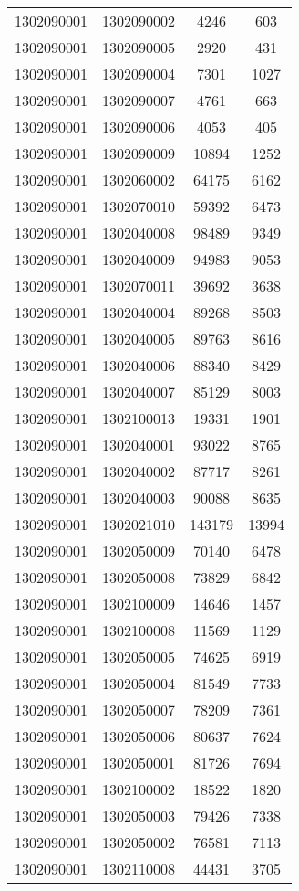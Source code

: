 \begin{longtable}{llcc}
1302090001 & 1302090002 & 4246 & 603\\
1302090001 & 1302090005 & 2920 & 431\\
1302090001 & 1302090004 & 7301 & 1027\\
1302090001 & 1302090007 & 4761 & 663\\
1302090001 & 1302090006 & 4053 & 405\\
1302090001 & 1302090009 & 10894 & 1252\\
1302090001 & 1302060002 & 64175 & 6162\\
1302090001 & 1302070010 & 59392 & 6473\\
1302090001 & 1302040008 & 98489 & 9349\\
1302090001 & 1302040009 & 94983 & 9053\\
1302090001 & 1302070011 & 39692 & 3638\\
1302090001 & 1302040004 & 89268 & 8503\\
1302090001 & 1302040005 & 89763 & 8616\\
1302090001 & 1302040006 & 88340 & 8429\\
1302090001 & 1302040007 & 85129 & 8003\\
1302090001 & 1302100013 & 19331 & 1901\\
1302090001 & 1302040001 & 93022 & 8765\\
1302090001 & 1302040002 & 87717 & 8261\\
1302090001 & 1302040003 & 90088 & 8635\\
1302090001 & 1302021010 & 143179 & 13994\\
1302090001 & 1302050009 & 70140 & 6478\\
1302090001 & 1302050008 & 73829 & 6842\\
1302090001 & 1302100009 & 14646 & 1457\\
1302090001 & 1302100008 & 11569 & 1129\\
1302090001 & 1302050005 & 74625 & 6919\\
1302090001 & 1302050004 & 81549 & 7733\\
1302090001 & 1302050007 & 78209 & 7361\\
1302090001 & 1302050006 & 80637 & 7624\\
1302090001 & 1302050001 & 81726 & 7694\\
1302090001 & 1302100002 & 18522 & 1820\\
1302090001 & 1302050003 & 79426 & 7338\\
1302090001 & 1302050002 & 76581 & 7113\\
1302090001 & 1302110008 & 44431 & 3705\\

\end{longtable}
